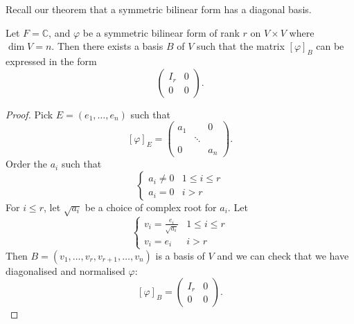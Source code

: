 \documentclass[a4paper]{scrartcl}
\begin{document}
Recall our theorem that a symmetric bilinear form has a diagonal basis.

\begin{corollary}
    Let $F=\mathbb{C}$, and $\varphi$ be a symmetric bilinear form of rank $r$ on $V \times V$ where $\operatorname{dim}V=n$. Then there exists a basis $B$ of $V$ such that the matrix $[\varphi]_B$ can be expressed in the form
    \[\left(
    \begin{array}{c|c}
     I_r &0\\
     \hline
     0&0
     \end{array}
     \right).\]
\end{corollary}
\begin{proof}
     Pick $E=(e_1, \ldots , e_n)$ such that 
     \[[\varphi]_E=
     \begin{pmatrix}
     a_1&&0\\ &\ddots&\\ 0&&a_n
     \end{pmatrix}
     .\]
     Order the $a_i$ such that 
     \begin{equation*}
          \begin{cases}
              a_i \neq 0 & 1 \leq i \leq r\\
              a_i=0 & i>r
          \end{cases}
     \end{equation*}
     For $i \leq r$, let $\sqrt{a_i}$ be a choice of complex root for $a_i$. Let 
     \begin{equation*}
        \begin{cases}
            v_i=\frac{e_i}{\sqrt{a_i}} & 1 \leq i \leq r\\
            v_i=e_i& i>r
        \end{cases}
   \end{equation*}
   Then $B= (v_1, \ldots ,v_r, v_{r+1}, \ldots , v_n)$ is a basis of $V$ and we can check that we have diagonalised and normalised $\varphi$:
   \[[\varphi]_B=\left(
     \begin{array}{c|c}
      I_r &0\\
      \hline
      0&0
      \end{array}
      \right).\]
\end{proof}
\end{document}
